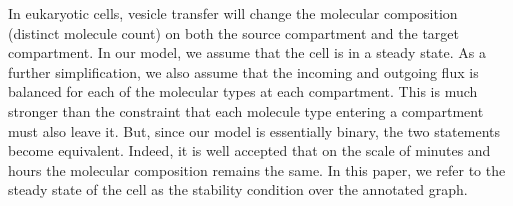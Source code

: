 In eukaryotic cells, vesicle transfer will change the molecular composition (distinct molecule count) on both the source compartment and the target compartment. 
%
In our model, we assume that the cell is in a steady state. As a further simplification, we also assume that the incoming and outgoing flux is balanced for each of the molecular types at each compartment.
%
This is much stronger than the constraint that each molecule type entering a compartment must also leave it.
%
But, since our model is essentially binary, the two statements become equivalent. 
%
Indeed, it is well accepted that on the scale of minutes and hours the molecular composition remains the same. 
%
In this paper, we refer to the steady state of the cell \cite{mani2016stacking} as the stability condition over the annotated graph.


